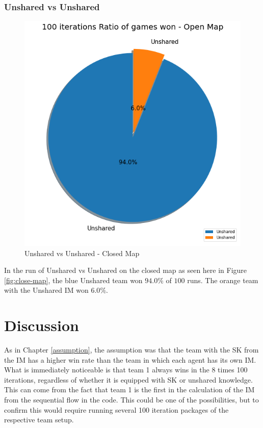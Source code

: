 \documentclass[]{report}
\begin{document}
		\subsection{Unshared vs Unshared}
		\begin{figure}[h!]
			\centering
			\includegraphics[width=0.9\linewidth]{"Images/100 Games Unshared vs Unshared Close Map"}
			\caption[Unshared vs Unshared - Closed Map]{Unshared vs Unshared - Closed Map}
			\label{fig:100-games-unshared-vs-unshared-close-map}
		\end{figure}
			In the run of Unshared vs Unshared on the closed map as seen here in Figure \ref{fig:close-map}, the blue Unshared team won $94.0\%$ of $100$ runs. The orange team with the Unshared \ac{IM} won $6.0\%$.
		
		
		\chapter{Discussion}
		As in Chapter \ref{assumption}, the assumption was that the team with the \ac{SK} from the \ac{IM} has a higher win rate than the team in which each agent has its own \ac{IM}. \newline
		What is immediately noticeable is that team 1 always wins in the 8 times 100 iterations, regardless of whether it is equipped with \ac{SK} or unshared knowledge. This can come from the fact that team 1 is the first in the calculation of the \ac{IM} from the sequential flow in the code. This could be one of the possibilities, but to confirm this would require running several 100 iteration packages of the respective team setup.
		
\end{document}
